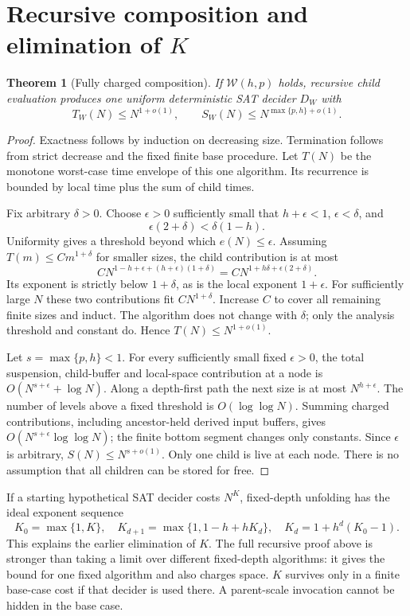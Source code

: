 \documentclass[11pt]{article}
\newtheorem{theorem}{Theorem}
\begin{document}
\section{Recursive composition and elimination of $K$}
\begin{theorem}[Fully charged composition]
If $\mathcal W(h,p)$ holds, recursive child evaluation produces one
uniform deterministic SAT decider $D_W$ with
\[
 T_W(N)\le N^{1+o(1)},\qquad
 S_W(N)\le N^{\max\{p,h\}+o(1)}.
\]
\end{theorem}
\begin{proof}
Exactness follows by induction on decreasing size. Termination follows
from strict decrease and the fixed finite base procedure. Let $T(N)$ be
the monotone worst-case time envelope of this one algorithm. Its recurrence
is bounded by local time plus the sum of child times.

Fix arbitrary $\delta>0$. Choose $\epsilon>0$ sufficiently small that
$h+\epsilon<1$, $\epsilon<\delta$, and
\[
 \epsilon(2+\delta)<\delta(1-h).
\]
Uniformity gives a threshold beyond which $e(N)\le\epsilon$. Assuming
$T(m)\le C m^{1+\delta}$ for smaller sizes, the child contribution is at most
\[
 C N^{1-h+\epsilon+(h+\epsilon)(1+\delta)}
 = C N^{1+h\delta+\epsilon(2+\delta)}.
\]
Its exponent is strictly below $1+\delta$, as is the local exponent
$1+\epsilon$. For sufficiently large $N$ these two contributions fit
$C N^{1+\delta}$. Increase $C$ to cover all remaining finite sizes and
induct. The algorithm does not change with $\delta$; only the analysis
threshold and constant do. Hence $T(N)\le N^{1+o(1)}$.

Let $s=\max\{p,h\}<1$. For every sufficiently small fixed $\epsilon>0$,
the total suspension, child-buffer and local-space contribution at a node
is $O(N^{s+\epsilon}+\log N)$. Along a depth-first path the next size is
at most $N^{h+\epsilon}$. The number of levels above a fixed threshold is
$O(\log\log N)$. Summing charged contributions, including ancestor-held
derived input buffers, gives $O(N^{s+\epsilon}\log\log N)$; the finite
bottom segment changes only constants. Since $\epsilon$ is arbitrary,
$S(N)\le N^{s+o(1)}$. Only one child is live at each node. There is no
assumption that all children can be stored for free.
\end{proof}

If a starting hypothetical SAT decider costs $N^K$, fixed-depth unfolding
has the ideal exponent sequence
\[
 K_0=\max\{1,K\},\quad K_{d+1}=\max\{1,1-h+hK_d\},\quad
 K_d=1+h^d(K_0-1).
\]
This explains the earlier elimination of $K$. The full recursive proof
above is stronger than taking a limit over different fixed-depth
algorithms: it gives the bound for one fixed algorithm and also charges
space. $K$ survives only in a finite base-case cost if that decider is
used there. A parent-scale invocation cannot be hidden in the base case.
\end{document}
